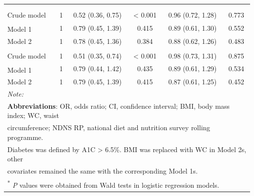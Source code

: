 \begin{table}[H]
\begin{tabular}[t]{lccccc}
		\addlinespace[0.3em]
		\multicolumn{6}{l}{\textbf{Women (n = 3618)}}\\
		\addlinespace[0.3em]
		\multicolumn{6}{l}{\hspace{1em}\textbf{Hypertension}}\\
		\hspace{1em}\hspace{1em}Crude model & 1 & 0.52 (0.36, 0.75) & < 0.001 & 0.96 (0.72, 1.28) & 0.773\\
		\hspace{1em}\hspace{1em}Model 1\textsuperscript{\ddag} & 1 & 0.79 (0.45, 1.39) & 0.415 & 0.89 (0.61, 1.30) & 0.552\\
		\hspace{1em}\hspace{1em}Model 2 & 1 & 0.78 (0.45, 1.36) & 0.384 & 0.88 (0.62, 1.26) & 0.483\\
		\addlinespace[0.3em]
		\multicolumn{6}{l}{\hspace{1em}\textbf{Hypertension in non-diabetics}}\\
		\hspace{1em}\hspace{1em}Crude model & 1 & 0.51 (0.35, 0.74) & < 0.001 & 0.98 (0.73, 1.31) & 0.875\\
		\hspace{1em}\hspace{1em}Model 1\textsuperscript{\ddag} & 1 & 0.79 (0.44, 1.42) & 0.435 & 0.89 (0.61, 1.29) & 0.534\\
		\hspace{1em}\hspace{1em}Model 2 & 1 & 0.79 (0.45, 1.39) & 0.415 & 0.87 (0.61, 1.25) & 0.452\\
		\bottomrule
		\multicolumn{6}{l}{{\scriptsize \textit{Note: }}}\\
		\multicolumn{6}{l}{{\scriptsize \textbf{Abbreviations}: OR, odds ratio; CI, confidence interval; BMI, body mass index; WC, waist}}\\
		\multicolumn{6}{l}{{\scriptsize  circumference; NDNS RP, national diet and nutrition survey rolling programme.}}\\
		\multicolumn{6}{l}{{\scriptsize Diabetes was defined by A1C > 6.5\%. BMI was replaced with WC in Model 2s, other}}\\
		\multicolumn{6}{l}{{\scriptsize covariates remained the same with the corresponding Model 1s.}}\\
		\multicolumn{6}{l}{{\scriptsize \textsuperscript{*} \textit{P} values were obtained from Wald tests in logistic regression models.}}\\ 

\end{tabular}
\end{table}
